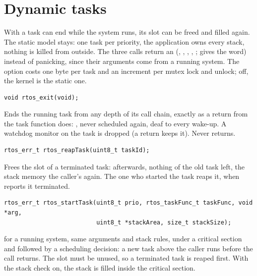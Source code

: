 \section{Dynamic tasks}
\label{sec:dyntasks}

With  a task can end while the system runs, its slot can
be freed and filled again. The static model stays: one task per priority, the application
owns every stack, nothing is killed from outside. The three calls return an
 (, , ,
, ;  gives the word)
instead of panicking, since their arguments come from a running system. The option costs
one byte per task and an increment per mutex lock and unlock; off, the kernel is the
static one.

\begin{lstlisting}
void rtos_exit(void);
\end{lstlisting}
Ends the running task from any depth of its call chain, exactly as a return from the task
function does: , never scheduled again, deaf to every
wake-up. A watchdog monitor on the task is dropped (a return keeps it). Never returns.

\begin{lstlisting}
rtos_err_t rtos_reapTask(uint8_t taskId);
\end{lstlisting}
Frees the slot of a terminated task:  afterwards, nothing of the
old task left, the stack memory the caller's again. The one who started the task reaps
it, when  reports it terminated.

\begin{lstlisting}
rtos_err_t rtos_startTask(uint8_t prio, rtos_taskFunc_t taskFunc, void *arg,
                          uint8_t *stackArea, size_t stackSize);
\end{lstlisting}
 for a running system, same arguments and stack rules, under a
critical section and followed by a scheduling decision: a new task above the caller runs
before the call returns. The slot must be unused, so a terminated task is reaped first.
With the stack check on, the stack is filled inside the critical section.

